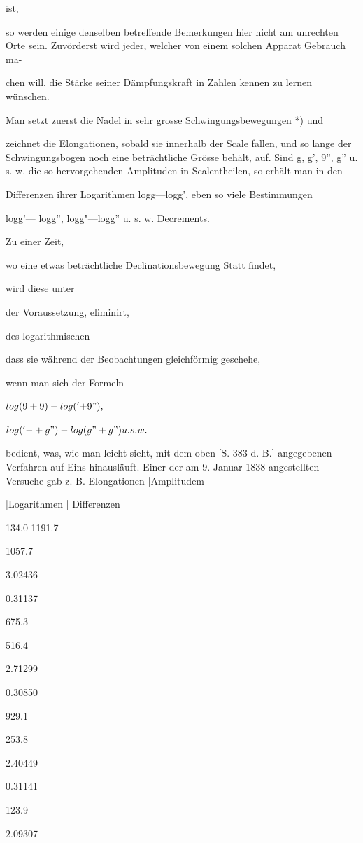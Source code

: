 \documentclass[12pt,a4paper]{article}
\begin{document}
ist,

so werden einige denselben betreffende Bemerkungen hier nicht am unrechten Orte sein. Zuvörderst wird jeder, welcher von einem solchen Apparat Gebrauch ma-

chen will, die Stärke seiner Dämpfungskraft in Zahlen kennen zu lernen wünschen.

Man setzt zuerst die Nadel in sehr grosse Schwingungsbewegungen *) und

zeichnet die Elongationen, sobald sie innerhalb der Scale fallen, und so lange der Schwingungsbogen noch eine beträchtliche Grösse behält, auf. Sind g, g’, 9”, g” u. s. w. die so hervorgehenden Amplituden in Scalentheilen, so erhält man in den

Differenzen ihrer Logarithmen logg—logg', eben so viele Bestimmungen

logg’— logg”, logg"—logg” u. s. w. Decrements.

Zu einer Zeit,

wo eine etwas beträchtliche Declinationsbewegung Statt findet,

wird diese unter

der Voraussetzung, eliminirt,

des logarithmischen

dass sie während der Beobachtungen gleichförmig geschehe,

wenn man sich der Formeln

$log (9 +9) -log(^{\prime}+9"),$

$log(^{\prime}-+g")-log(g"+g") u. s. w.$

bedient, was, wie man leicht sieht, mit dem oben [S. 383 d. B.] angegebenen Verfahren auf Eins hinausläuft. Einer der am 9. Januar 1838 angestellten Versuche gab z. B. Elongationen |Amplitudem

|Logarithmen | Differenzen

134.0 1191.7

1057.7

3.02436

0.31137

675.3

516.4

2.71299

0.30850

929.1

253.8

2.40449

0.31141

123.9

2.09307
\end{document}
